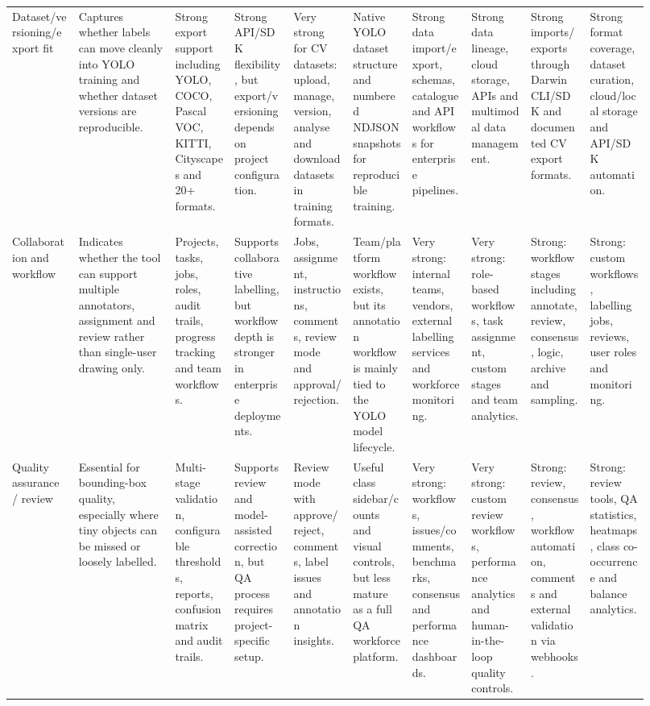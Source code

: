 \begin{landscape}
\begin{longtable}{@{}Y{0.09\linewidth}Y{0.13\linewidth}Y{0.087\linewidth}Y{0.087\linewidth}Y{0.087\linewidth}Y{0.087\linewidth}Y{0.087\linewidth}Y{0.087\linewidth}Y{0.087\linewidth}Y{0.087\linewidth}@{}}
Dataset/versioning/export fit &
Captures whether labels can move cleanly into YOLO training and whether dataset versions are reproducible. &
Strong export support including YOLO, COCO, Pascal VOC, KITTI, Cityscapes and 20+ formats. &
Strong API/SDK flexibility, but export/versioning depends on project configuration. &
Very strong for CV datasets: upload, manage, version, analyse and download datasets in training formats. &
Native YOLO dataset structure and numbered NDJSON snapshots for reproducible training. &
Strong data import/export, schemas, catalogue and API workflows for enterprise pipelines. &
Strong data lineage, cloud storage, APIs and multimodal data management. &
Strong imports/exports through Darwin CLI/SDK and documented CV export formats. &
Strong format coverage, dataset curation, cloud/local storage and API/SDK automation. \\

Collaboration and workflow &
Indicates whether the tool can support multiple annotators, assignment and review rather than single-user drawing only. &
Projects, tasks, jobs, roles, audit trails, progress tracking and team workflows. &
Supports collaborative labelling, but workflow depth is stronger in enterprise deployments. &
Jobs, assignment, instructions, comments, review mode and approval/rejection. &
Team/platform workflow exists, but its annotation workflow is mainly tied to the YOLO model lifecycle. &
Very strong: internal teams, vendors, external labelling services and workforce monitoring. &
Very strong: role-based workflows, task assignment, custom stages and team analytics. &
Strong: workflow stages including annotate, review, consensus, logic, archive and sampling. &
Strong: custom workflows, labelling jobs, reviews, user roles and monitoring. \\

Quality assurance / review &
Essential for bounding-box quality, especially where tiny objects can be missed or loosely labelled. &
Multi-stage validation, configurable thresholds, reports, confusion matrix and audit trails. &
Supports review and model-assisted correction, but QA process requires project-specific setup. &
Review mode with approve/reject, comments, label issues and annotation insights. &
Useful class sidebar/counts and visual controls, but less mature as a full QA workforce platform. &
Very strong: workflows, issues/comments, benchmarks, consensus and performance dashboards. &
Very strong: custom review workflows, performance analytics and human-in-the-loop quality controls. &
Strong: review, consensus, workflow automation, comments and external validation via webhooks. &
Strong: review tools, QA statistics, heatmaps, class co-occurrence and balance analytics. \\


\end{longtable}
\end{landscape}
